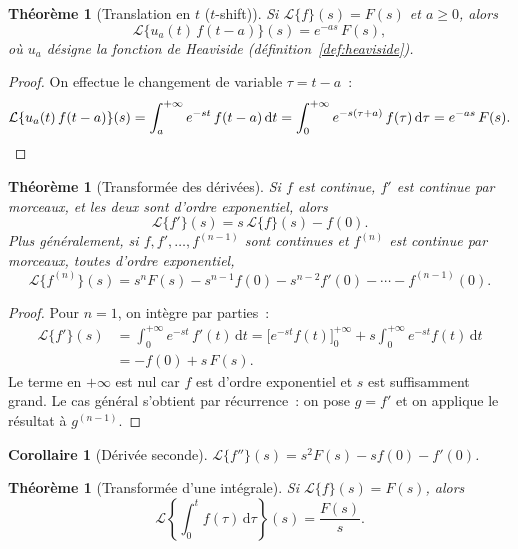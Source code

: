 \documentclass[12pt,a4paper,openany]{book}
\theoremstyle{definition}
\theoremstyle{plain}
\newtheorem{theoreme}[definition]{Théorème}
\newtheorem{corollaire}[definition]{Corollaire}
\theoremstyle{remark}
\newcommand{\dd}{\mathrm{d}}
\begin{document}
\begin{theoreme}[Translation en $t$ ($t$-shift)]\label{thm:t-shift}
  Si $\mathcal{L}\{f\}(s)=F(s)$ et $a\geq 0$, alors
  \[
    \mathcal{L}\{u_a(t)\,f(t-a)\}(s) = e^{-as}\,F(s),
  \]
  où $u_a$ désigne la fonction de Heaviside
  (définition~\ref{def:heaviside}).
\end{theoreme}

\begin{proof}
  On effectue le changement de variable $\tau=t-a$~:
  \[
    \mathcal{L}\{u_a(t)\,f(t-a)\}(s)
    = \int_a^{+\infty}e^{-st}\,f(t-a)\,\dd t
    = \int_0^{+\infty}e^{-s(\tau+a)}\,f(\tau)\,\dd\tau
    = e^{-as}\,F(s).
    \qedhere
  \]
\end{proof}

\begin{theoreme}[Transformée des dérivées]\label{thm:laplace-derivee}
  Si $f$ est continue, $f'$ est continue par morceaux, et les deux
  sont d'ordre exponentiel, alors
  \[
    \mathcal{L}\{f'\}(s) = s\,\mathcal{L}\{f\}(s) - f(0).
  \]
  Plus généralement, si $f,f',\ldots,f^{(n-1)}$ sont continues et
  $f^{(n)}$ est continue par morceaux, toutes d'ordre exponentiel,
  \[
    \mathcal{L}\{f^{(n)}\}(s)
    = s^n F(s) - s^{n-1}f(0) - s^{n-2}f'(0) - \cdots - f^{(n-1)}(0).
  \]
\end{theoreme}

\begin{proof}
  Pour $n=1$, on intègre par parties~:
  \begin{align*}
    \mathcal{L}\{f'\}(s)
    &= \int_0^{+\infty}e^{-st}\,f'(t)\,\dd t
    = \bigl[e^{-st}f(t)\bigr]_0^{+\infty}
      + s\int_0^{+\infty}e^{-st}f(t)\,\dd t \\
    &= -f(0) + s\,F(s).
  \end{align*}
  Le terme en $+\infty$ est nul car $f$ est d'ordre exponentiel et
  $s$ est suffisamment grand. Le cas général s'obtient par récurrence~:
  on pose $g=f'$ et on applique le résultat à $g^{(n-1)}$.
\end{proof}

\begin{corollaire}[Dérivée seconde]\label{cor:laplace-f2}
  $\mathcal{L}\{f''\}(s)=s^2F(s)-sf(0)-f'(0)$.
\end{corollaire}

\begin{theoreme}[Transformée d'une intégrale]\label{thm:laplace-integrale}
  Si $\mathcal{L}\{f\}(s)=F(s)$, alors
  \[
    \mathcal{L}\!\left\{\int_0^t f(\tau)\,\dd\tau\right\}(s)
    = \frac{F(s)}{s}.
  \]
\end{theoreme}
\end{document}
